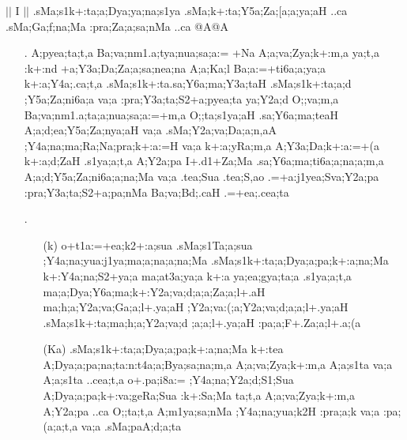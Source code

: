 \begin{center}
$||$ {\sktf I }$||$ {\sktf .sMa;s1k+:ta;a;Dya;ya;na;s1ya
.sMa;k+:ta;Y5a;Za;[a;a;ya;aH ..ca .sMa;Ga;f;na;Ma
:pra;Za;a;sa;nMa ..ca @A@A}
\end{center}

\begin{itemize}
 \item[{\sktf 29}.] {\sktf A;pyea;ta;t,a Ba;va;nm1.a;tya;nua;sa;a:=%
+Na A;a;va;Zya;k+:m,a\ZF{,} ya;t,a :k+:nd%
+a;Y3a;Da;Za;a;sa;nea;na A;a;Ka;l%
\ZF{-}Ba;a:=+ti6a;a;ya;a k+:a;Y4a;.ca;t,a .sMa;s1k+:ta.sa;Y6a;ma;Y3a;taH .sMa;s1k+:ta;a;d%
;Y5a;Za;ni6a;a va;a :pra;Y3a;ta;S2+a;pyea;ta  ya;Y2a;d
O;;va;m,a\ZF{,} Ba;va;nm1.a;ta;a;nua;sa;a:=+m,a O;;ta;s1ya;aH
.sa;Y6a;ma;teaH A;a;d;ea;Y5a;Za;nya;aH va;a .sMa;Y2a;va;Da;a;n,aA \ZF{(};Y4a;na;ma;Ra;Na;pra;k+:a:=H va;a\ZF{),}
k+:a;yRa;m,a\ZF{,} A;Y3a;Da;k+:a:=+(a k+:a;d;ZaH .s1ya;a;t,a  A;Y2a;pa I+.d1+Za;Ma
.sa;Y6a;ma;ti6a;a;na;a;m,a A;a;d;Y5a;Za;ni6a;a;na;Ma va;a .tea;Sua
.tea;S,ao .=+a:j1yea;Sva;Y2a;pa :pra;Y3a;ta;S2+a;pa;nMa Ba;va;Bd;.caH
.=+ea;.cea;ta}
 
 \item[{\sktf 30}.] \begin{itemize}
                 
                 \item[({\sktf k})] {\sktf o+t1a:=+ea;k2+:a;sua
.sMa;s1Ta;a;sua ;Y4a;na;yua:j1ya;ma;a;na;a;na;Ma .sMa;s1k+:ta;a;Dya;a;pa;k+:a;na;Ma k+:Y4a;na;S2+ya;a ma;at3a;ya;a k+:a ya;ea;gya;ta;a .s1ya;a;t,a\ZF{)}
ma;a;Dya;Y6a;ma;k+:Y2a;va;d;a;a;Za;a;l+.aH\ZF{,} \ZF{)} ma;h;a;Y2a;va;Ga;a;l+.ya;aH\ZF{,} \ZF{)}
;Y2a;va:(;a;Y2a;va;d;a;a;l+.ya;aH\ZF{,} \ZF{)} .sMa;s1k+:ta;ma;h;a;Y2a;va;d%
;a;a;l+.ya;aH\ZF{,} :pa;a;F+.Za;a;l+.a;(a}
                 
                 \item[({\sktf Ka})] {\sktf .sMa;s1k+:ta;a;Dya;a;pa;k+:a;na;Ma k+:tea
A;Dya;a;pa;na;ta:n:t4a;a;Bya;sa;na;m,a A;a;va;Zya;k+:m,a
A;a;s1ta va;a A;a;s1ta ..cea;t,a\ZF{,} o+.pa;i8a:= ;Y4a;na;Y2a;d;S1;Sua
A;Dya;a;pa;k+:va;geRa;Sua :k+:Sa;Ma ta;t,a A;a;va;Zya;k+:m,a
A;Y2a;pa ..ca\ZF{,} O;;ta;t,a A;m1ya;sa;nMa ;Y4a;na;yua;k2H%
 :pra;a;k va;a :pa;(a;a;t,a va;a .sMa;paA;d;a;ta} 
                 

\end{itemize}
\end{itemize}

